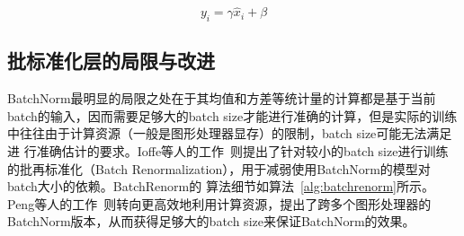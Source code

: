 \begin{equation}
  y_{i}=\gamma \widehat{x}_{i}+\beta
\end{equation}


\subsection{批标准化层的局限与改进}
\label{section:problem}

BatchNorm最明显的局限之处在于其均值和方差等统计量的计算都是基于当前batch的输入，因而需要足够大的batch size才能进行准确的计算，但是实际的训练中往往由于计算资源（一般是图形处理器显存）的限制，batch size可能无法满足进
行准确估计的要求。Ioffe等人的工作~\citep{ioffe2017batch}则提出了针对较小的batch size进行训练的批再标准化（Batch Renormalization），用于减弱使用BatchNorm的模型对batch大小的依赖。BatchRenorm的
算法细节如算法~\ref{alg:batchrenorm}所示。
Peng等人的工作~\citep{peng_megdet:_2018}则转向更高效地利用计算资源，提出了跨多个图形处理器的BatchNorm版本，从而获得足够大的batch size来保证BatchNorm的效果。

